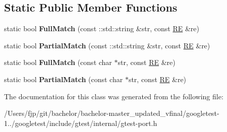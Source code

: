 \subsection*{Static Public Member Functions}
\begin{DoxyCompactItemize}
\item 
\mbox{\label{classtesting_1_1internal_1_1_r_e_aa79a950758d0f1d62f7762d1e9cefe86}} 
static bool {\bfseries Full\+Match} (const \+::std\+::string \&str, const \mbox{\hyperlink{classtesting_1_1internal_1_1_r_e}{RE}} \&re)
\item 
\mbox{\label{classtesting_1_1internal_1_1_r_e_a1e81f9a87211bdca645e025f8f0236c8}} 
static bool {\bfseries Partial\+Match} (const \+::std\+::string \&str, const \mbox{\hyperlink{classtesting_1_1internal_1_1_r_e}{RE}} \&re)
\item 
\mbox{\label{classtesting_1_1internal_1_1_r_e_a2b13ec1f6ccd6c32f7efa01e21588f0b}} 
static bool {\bfseries Full\+Match} (const char $\ast$str, const \mbox{\hyperlink{classtesting_1_1internal_1_1_r_e}{RE}} \&re)
\item 
\mbox{\label{classtesting_1_1internal_1_1_r_e_a97495dd4c2bb9589522823f060c8e8ba}} 
static bool {\bfseries Partial\+Match} (const char $\ast$str, const \mbox{\hyperlink{classtesting_1_1internal_1_1_r_e}{RE}} \&re)
\end{DoxyCompactItemize}


The documentation for this class was generated from the following file\+:\begin{DoxyCompactItemize}
\item 
/\+Users/fjp/git/bachelor/bachelor-\/master\+\_\+updated\+\_\+vfinal/googletest-\/1../googletest/include/gtest/internal/gtest-\/port.\+h\end{DoxyCompactItemize}
